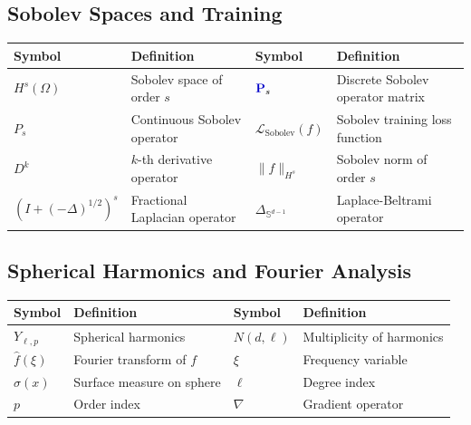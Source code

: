 \documentclass[a4paper]{article}
\theoremstyle{plain}
\theoremstyle{definition}
\theoremstyle{remark}
\begin{document}
\begin{tcolorbox}[colback=blue!5,colframe=blue!50!black,title={\large \textbf{Mathematical Notation Reference}},enhanced,drop shadow]

\newpage
\subsection*{Sobolev Spaces and Training}
\begin{longtable}{p{}p{}p{}p{}}
\toprule
\textbf{Symbol} & \textbf{Definition} & \textbf{Symbol} & \textbf{Definition} \\
\midrule
$H^s(\Omega)$ & Sobolev space of order $s$ & $\textcolor{sobolevcolor}{\mathbf{P}}_s$ & Discrete Sobolev operator matrix \\
$P_s$ & Continuous Sobolev operator & $\mathcal{L}_{\text{Sobolev}}(f)$ & Sobolev training loss function \\
$D^k$ & $k$-th derivative operator & $\|f\|_{H^s}$ & Sobolev norm of order $s$ \\
$(I + (-\Delta)^{1/2})^s$ & Fractional Laplacian operator & $\Delta_{\mathbb{S}^{d-1}}$ & Laplace-Beltrami operator \\
\bottomrule
\end{longtable}

\subsection*{Spherical Harmonics and Fourier Analysis}
\begin{longtable}{p{}p{}p{}p{}}
\toprule
\textbf{Symbol} & \textbf{Definition} & \textbf{Symbol} & \textbf{Definition} \\
\midrule
$Y_{\ell,p}$ & Spherical harmonics & $N(d,\ell)$ & Multiplicity of harmonics \\
$\hat{f}(\xi)$ & Fourier transform of $f$ & $\xi$ & Frequency variable \\
$\sigma(x)$ & Surface measure on sphere & $\ell$ & Degree index \\
$p$ & Order index & $\nabla$ & Gradient operator \\
\bottomrule
\end{longtable}


\end{tcolorbox}
\end{document}
